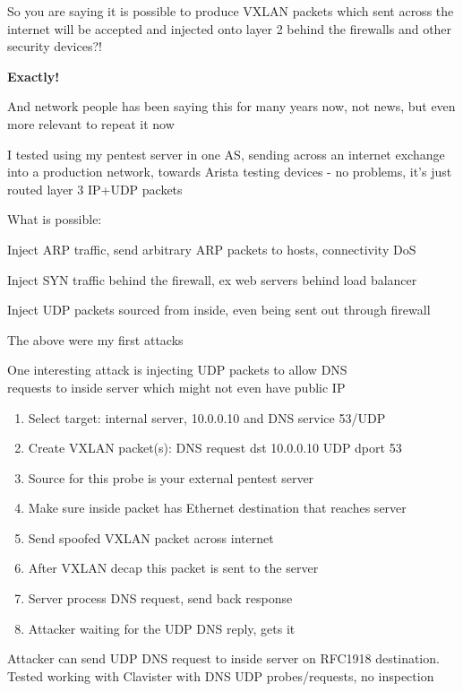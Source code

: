 \documentclass[Screen16to9,17pt,footrule]{foils}
\begin{document}
\vskip 2cm
So you are saying it is possible to produce VXLAN packets which sent across the internet will be accepted and injected onto layer 2 behind the firewalls and other security devices?!

\vskip 1cm
{\bf\LARGE Exactly!}

\vskip 2cm
And network people has been saying this for many years now, not news, but even more relevant to repeat it now


I tested using my pentest server in one AS, sending across an internet exchange into a production network, towards Arista testing devices - no problems, it's just routed layer 3 IP+UDP packets


What is possible:
\begin{list2}
\item Inject ARP traffic, send arbitrary ARP packets to hosts, connectivity DoS
\item Inject SYN traffic behind the firewall, ex web servers behind load balancer
\item Inject UDP packets sourced from inside, even being sent out through firewall
\end{list2}

\vskip 1cm
\centerline{The above were my first attacks}




One interesting attack is injecting UDP packets to allow DNS\\
requests to inside server which might not even have public IP

\begin{enumerate}
\item Select target: internal server, 10.0.0.10 and DNS service 53/UDP
\item Create VXLAN packet(s): DNS request dst 10.0.0.10 UDP dport 53
\item Source for this probe is your external pentest server
\item Make sure inside packet has Ethernet destination that reaches server
\item Send spoofed VXLAN packet across internet
\item After VXLAN decap this packet is sent to the server
\item Server process DNS request, send back response
\item Attacker waiting for the UDP DNS reply, gets it
\end{enumerate}
 Attacker can send UDP DNS request to inside server on RFC1918 destination.
 Tested working with Clavister with DNS UDP probes/requests, no inspection \smiley
\end{document}
